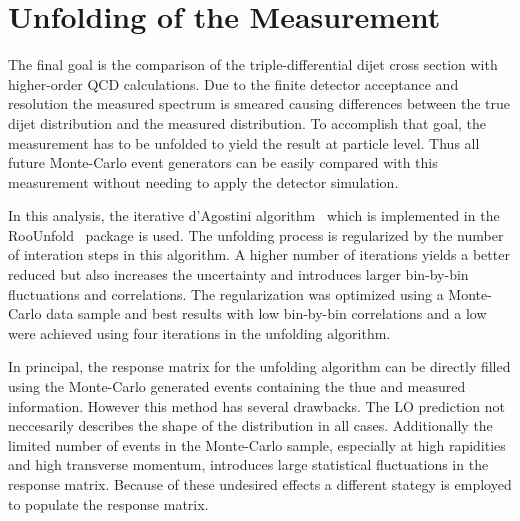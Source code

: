 
\section{Unfolding of the Measurement}
\label{sec:unfolding}

The final goal is the comparison of the triple-differential dijet cross section
with higher-order QCD calculations. Due to the finite detector acceptance and resolution
the measured spectrum is smeared causing differences between the true dijet \ptavg distribution
and the measured distribution. To accomplish that goal, the measurement has
to be unfolded to yield the result at particle level. Thus all future Monte-Carlo event
generators can be easily compared with this measurement without needing to apply
the detector simulation.

In this analysis, the iterative d'Agostini algorithm~\cite{DAgostini:1994zf} which is
implemented in the RooUnfold~\cite{Adye:2011gm} package is used. The unfolding
process is regularized by the number of interation steps in this algorithm. A
higher number of iterations yields a better reduced \chisq but also increases
the uncertainty and introduces larger bin-by-bin fluctuations and correlations.
The regularization was optimized using a Monte-Carlo data sample and best
results with low bin-by-bin correlations and a low \chisq were achieved using
four iterations in the unfolding algorithm.

In principal, the response matrix for the unfolding algorithm can be directly
filled using the Monte-Carlo generated events containing the thue and measured
information. However this method has several drawbacks. The LO prediction not
neccesarily describes the shape of the distribution in all cases. Additionally
the limited number of events in the Monte-Carlo sample, especially at high
rapidities and high transverse momentum, introduces large statistical
fluctuations in the response matrix. Because of these undesired effects a
different stategy is employed to populate the response matrix.

